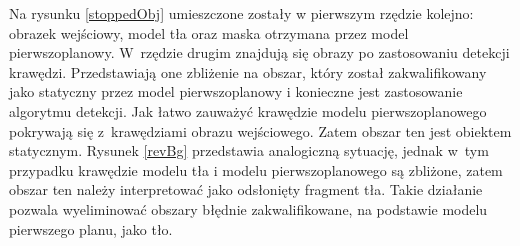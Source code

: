 \documentclass[10pt,a4paper]{article}
\begin{document}
Na rysunku \ref{stoppedObj} umieszczone zostały w pierwszym rzędzie kolejno: obrazek wejściowy, model tła oraz maska otrzymana przez model pierwszoplanowy. W~rzędzie drugim znajdują się obrazy po zastosowaniu detekcji krawędzi. Przedstawiają one zbliżenie na obszar, który został zakwalifikowany jako statyczny przez model pierwszoplanowy i konieczne jest zastosowanie algorytmu detekcji. Jak łatwo zauważyć krawędzie modelu pierwszoplanowego pokrywają się z~krawędziami obrazu wejściowego. Zatem obszar ten jest obiektem statycznym. Rysunek \ref{revBg} przedstawia analogiczną sytuację, jednak w~tym przypadku krawędzie modelu tła i modelu pierwszoplanowego są zbliżone, zatem obszar ten należy interpretować jako odsłonięty fragment tła. Takie działanie pozwala wyeliminować obszary błędnie zakwalifikowane, na podstawie modelu pierwszego planu, jako tło.
\end{document}

